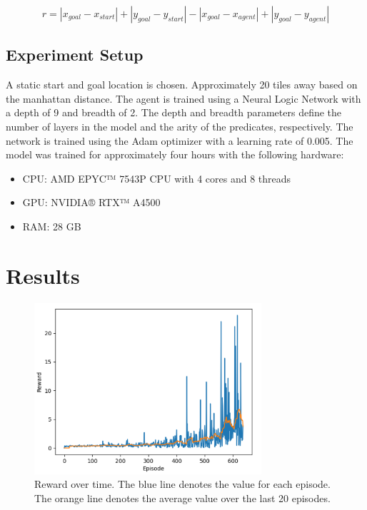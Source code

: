 \documentclass{article}
\begin{document}
\begin{equation}
    r = |x_{goal} - x_{start}| + |y_{goal} - y_{start}| - |x_{goal} - x_{agent}| + |y_{goal} - y_{agent}|
\end{equation}


\subsection{Experiment Setup}

A static start and goal location is chosen. Approximately 20 tiles away based on the manhattan distance. The agent is trained using a Neural Logic Network with a depth of 9 and breadth of 2. The depth and breadth parameters define the number of layers in the model and the arity of the predicates, respectively. The network is trained using the Adam optimizer with a learning rate of 0.005. The model was trained for approximately four hours with the following hardware:

\begin{itemize}
    \item CPU: AMD EPYC™ 7543P CPU with 4 cores and 8 threads
    \item GPU: NVIDIA® RTX™ A4500
    \item RAM: 28 GB
\end{itemize}

\section{Results}

\begin{figure}[h]
\centering
\includegraphics[width=0.75\textwidth]{imgs/plot1.png}
\caption{Reward over time. The blue line denotes the value for each episode. The orange line denotes the average value over the last 20 episodes.}
\end{figure}
\end{document}
